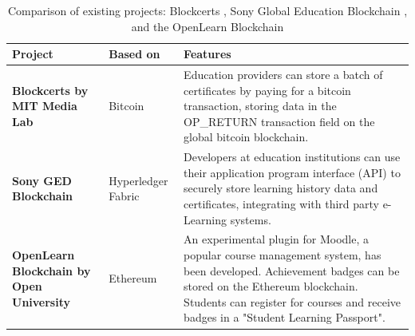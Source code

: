 \begin{table}[!ht]
	\caption[Comparison of existing projects: Blockcerts, Sony GED, and OpenLearn]
	{Comparison of existing projects: Blockcerts \citep{blockcerts2018}, Sony Global Education Blockchain \citep{sonyged2017}, and the OpenLearn Blockchain \citep{openlearn2018}}		 
	\centering
	\label{table:existingprojects}
	\begin{tabularx}{\textwidth}{|>{\bfseries}p{3.3cm}|p{2cm}|X|}
		\hline
		Project                                 & Based on            & Features                                                                                   \\
		\hline
		Blockcerts \newline by MIT Media Lab             & Bitcoin             & Education providers can store a batch of certificates by paying for a bitcoin transaction,
		storing data in the OP\_RETURN transaction field on the global bitcoin blockchain.                                                                         \\
		\hline
		Sony GED \newline Blockchain                     & Hyperledger \newline Fabric & Developers at education institutions can use their application program interface (API) to
		securely store learning history data and certificates, integrating with third party e-Learning systems.                                                    \\
		\hline
		OpenLearn \newline Blockchain \newline by Open University & Ethereum            & An experimental plugin for Moodle, a popular course management system, has been developed. \newline 
		Achievement badges can be stored on the Ethereum blockchain. Students can register for courses and receive badges in a "Student Learning Passport".\\
		\hline
	\end{tabularx}
\end{table}



